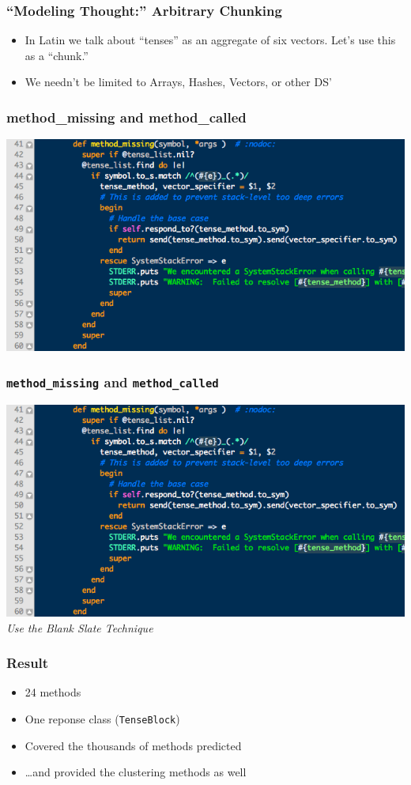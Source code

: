 \documentclass[slidestop,compress,mathserif,notes]{beamer}
\begin{document}
\begin{frame}
	\frametitle{ ``Modeling Thought:''  Arbitrary Chunking}
	\begin{itemize}
		\item In Latin we talk about ``tenses'' as an aggregate of six vectors.  Let's use this as a ``chunk.''
		\pause
		\item We needn't be limited to Arrays, Hashes, Vectors, or other DS'
	\end{itemize}
\end{frame}

\begin{frame}
	\frametitle{method\_missing and method\_called}
	\includegraphics[scale=0.45]{img/lv_mm.png}	
\end{frame}

\begin{frame}
	\frametitle{ \texttt{method\_missing} and \texttt{method\_called}}
	\includegraphics[scale=0.45]{img/lv_mm.png}	
	\vskip 0.5cm
	\emph{Use the Blank Slate Technique}
\end{frame}

\begin{frame}
	\frametitle{Result}
	\begin{itemize}
		\item 24 methods
		\item One reponse class (\texttt{TenseBlock})
		\item Covered the thousands of methods predicted
		\item \ldots and provided the clustering methods as well
	\end{itemize}
\end{frame}
\end{document}
